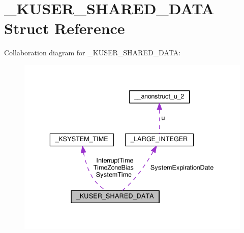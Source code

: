 \hypertarget{struct__KUSER__SHARED__DATA}{}\section{\+\_\+\+K\+U\+S\+E\+R\+\_\+\+S\+H\+A\+R\+E\+D\+\_\+\+D\+A\+T\+A Struct Reference}
\label{struct__KUSER__SHARED__DATA}


Collaboration diagram for \+\_\+\+K\+U\+S\+E\+R\+\_\+\+S\+H\+A\+R\+E\+D\+\_\+\+D\+A\+T\+A\+:
\nopagebreak
\begin{figure}[H]
\begin{center}
\leavevmode
\includegraphics[width=336pt]{struct__KUSER__SHARED__DATA__coll__graph}
\end{center}
\end{figure}
